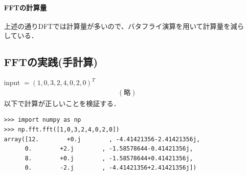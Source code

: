 \documentclass[11pt,a4j]{jarticle}%
\begin{document}
\paragraph*{FFTの計算量}
上述の通りDFTでは計算量が多いので、バタフライ演算を用いて計算量を減らしている．
\subsection*{FFTの実践(手計算)}
input $= (1,0,3,2,4,0,2,0)^T $
\begin{align}
(略)
\end{align}
以下で計算が正しいことを検証する．
\begin{lstlisting}[caption=FFTの実践(numpy篇),label=prog1]
>>> import numpy as np
>>> np.fft.fft([1,0,3,2,4,0,2,0])
array([12.        +0.j        , -4.41421356-2.41421356j,
      0.        +2.j        , -1.58578644-0.41421356j,
      8.        +0.j        , -1.58578644+0.41421356j,
      0.        -2.j        , -4.41421356+2.41421356j])
\end{lstlisting}
\end{document}
